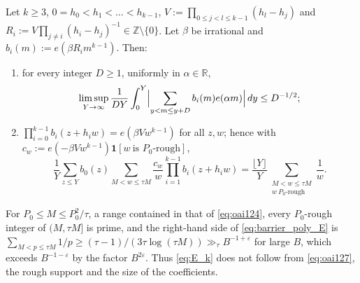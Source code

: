 \begin{proposition}
\label{prop:barrier_poly}
Let $k\ge3$, $0=h_0<h_1<\dots<h_{k-1}$, $V:=\prod_{0\le j<l\le k-1}(h_l-h_j)$ and $R_i:=V\prod_{j\ne i}(h_i-h_j)^{-1}\in\mathbb Z\setminus\{0\}$. Let $\beta$ be irrational and $b_i(m):=e(\beta R_im^{k-1})$. Then:
\begin{enumerate}
\item for every integer $D\ge1$, uniformly in $\alpha\in\mathbb R$,
\begin{equation}
\limsup_{Y\to\infty}\frac1{DY}\int_0^Y\Bigl|\sum_{y<m\le y+D}b_i(m)e(\alpha m)\Bigr|\,dy\le D^{-1/2};
\label{eq:barrier_poly_127}
\end{equation}
\item $\prod_{i=0}^{k-1}b_i(z+h_iw)=e(\beta Vw^{k-1})$ for all $z,w$; hence with $c_w:=e(-\beta Vw^{k-1})\mathbf 1[w\ \text{is }P_0\text{-rough}]$,
\begin{equation}
\frac1Y\sum_{z\le Y}b_0(z)\sum_{M<w\le\tau M}\frac{c_w}{w}\prod_{i=1}^{k-1}b_i(z+h_iw)=\frac{\lfloor Y\rfloor}Y\sum_{\substack{M<w\le\tau M\\ w\ P_0\text{-rough}}}\frac1w .
\label{eq:barrier_poly_E}
\end{equation}
\end{enumerate}
For $P_0\le M\le P_0^2/\tau$, a range contained in that of \eqref{eq:oai124}, every $P_0$-rough integer of $(M,\tau M]$ is prime, and the right-hand side of \eqref{eq:barrier_poly_E} is $\sum_{M<p\le\tau M}1/p\ge(\tau-1)/(3\tau\log(\tau M))\gg_\tau B^{-1+\varepsilon}$ for large $B$, which exceeds $B^{-1-\varepsilon}$ by the factor $B^{2\varepsilon}$. Thus \eqref{eq:E_k} does not follow from \eqref{eq:oai127}, the rough support and the size of the coefficients.
\end{proposition}

